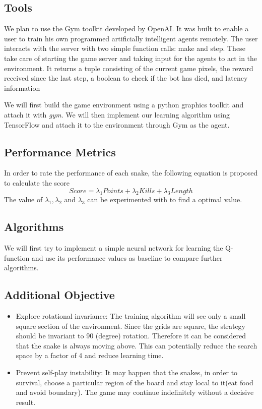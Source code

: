 \documentclass[conference]{IEEEtran}
\begin{document}
\subsection{Tools}
We plan to use the Gym toolkit developed by OpenAI\cite{n1}. It was built to enable a user to train his own programmed artificially intelligent agents remotely. The user interacts with the server with two simple function calls: make and step. These take care of starting the game server and taking input for the agents to act in the environment. It returns a tuple consisting of the current game pixels, the reward received since the last step, a boolean to check if the bot has died, and latency information
\newline\par
We will first build the game environment using a python graphics toolkit and attach it with \textit{gym}. We will then implement our learning algorithm using TensorFlow\cite{n2} and attach it to the environment through Gym as the agent. \newline\par
\subsection{Performance Metrics}
In order to rate the performance of each snake, the following equation is proposed to calculate the score
\begin{equation}
Score=\lambda_1 Points+ \lambda_2 Kills+\lambda_3Length
\end{equation}
The value of \({\lambda_1,\lambda_2}\) and \({\lambda_3}\) can be experimented with to find a optimal value.

\subsection{Algorithms}
We will first try to implement a simple neural network for learning the Q-function and use its performance values as baseline to compare further algorithms.  \newline\par


\subsection{Additional Objective}
\begin{itemize}
	\item{Explore rotational invariance: The training algorithm will see only a small square section of the environment. Since the grids are square, the strategy should be invariant to 90 (degree) rotation. Therefore it can be considered that the snake is always moving above. This can potentially reduce the search space by a factor of 4 and reduce learning time.}
	\item{Prevent self-play instability: It may happen that the snakes, in order to survival, choose a particular region of the board and stay local to it(eat food and avoid boundary). The game may continue indefinitely without a decisive result. }
\end{itemize}
\end{document}

